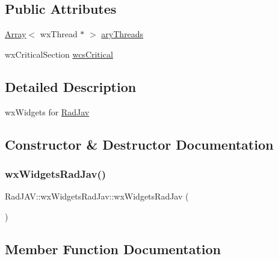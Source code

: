 \subsection*{Public Attributes}
\begin{DoxyCompactItemize}
\item 
\mbox{\hyperlink{class_rad_j_a_v_1_1_array}{Array}}$<$ wx\+Thread $\ast$ $>$ \mbox{\hyperlink{class_rad_j_a_v_1_1wx_widgets_rad_jav_a5fca84f30363bbe567c2c3c020fad9a4}{ary\+Threads}}
\item 
wx\+Critical\+Section \mbox{\hyperlink{class_rad_j_a_v_1_1wx_widgets_rad_jav_a93753443d9f01ad987a127cf496ba39e}{wcs\+Critical}}
\end{DoxyCompactItemize}


\subsection{Detailed Description}
wx\+Widgets for \mbox{\hyperlink{class_rad_j_a_v_1_1_rad_jav}{Rad\+Jav}} 

\subsection{Constructor \& Destructor Documentation}
\mbox{\label{class_rad_j_a_v_1_1wx_widgets_rad_jav_a81ff56b4ae9e9d4c50155151eadc35b7}} 
\subsubsection{\texorpdfstring{wx\+Widgets\+Rad\+Jav()}{wxWidgetsRadJav()}}
{\footnotesize\ttfamily Rad\+J\+A\+V\+::wx\+Widgets\+Rad\+Jav\+::wx\+Widgets\+Rad\+Jav (\begin{DoxyParamCaption}{ }\end{DoxyParamCaption})\hspace{0.3cm}{\ttfamily [inline]}}



\subsection{Member Function Documentation}
\mbox{\label{class_rad_j_a_v_1_1wx_widgets_rad_jav_add7d79813e2e017382a8a9da399e91ce}} 
